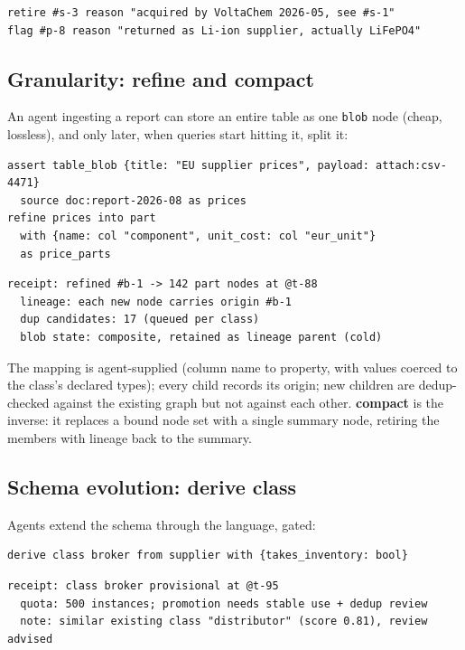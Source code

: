 \documentclass[11pt]{article}
\begin{document}
\begin{lstlisting}[style=gl]
retire #s-3 reason "acquired by VoltaChem 2026-05, see #s-1"
flag #p-8 reason "returned as Li-ion supplier, actually LiFePO4"
\end{lstlisting}

\subsection{Granularity: refine and compact}\label{sec:granularity}

An agent ingesting a report can store an entire table as one \texttt{blob} node (cheap, lossless), and only later, when queries start hitting it, split it:

\begin{lstlisting}[style=gl]
assert table_blob {title: "EU supplier prices", payload: attach:csv-4471}
  source doc:report-2026-08 as prices
refine prices into part
  with {name: col "component", unit_cost: col "eur_unit"}
  as price_parts
\end{lstlisting}
\begin{lstlisting}[style=res]
receipt: refined #b-1 -> 142 part nodes at @t-88
  lineage: each new node carries origin #b-1
  dup candidates: 17 (queued per class)
  blob state: composite, retained as lineage parent (cold)
\end{lstlisting}

The mapping is agent-supplied (column name to property, with values coerced to the class's declared types); every child records its origin; new children are dedup-checked against the existing graph but not against each other. \textbf{compact} is the inverse: it replaces a bound node set with a single summary node, retiring the members with lineage back to the summary.

\subsection{Schema evolution: derive class}

Agents extend the schema through the language, gated:

\begin{lstlisting}[style=gl]
derive class broker from supplier with {takes_inventory: bool}
\end{lstlisting}
\begin{lstlisting}[style=res]
receipt: class broker provisional at @t-95
  quota: 500 instances; promotion needs stable use + dedup review
  note: similar existing class "distributor" (score 0.81), review advised
\end{lstlisting}
\end{document}
